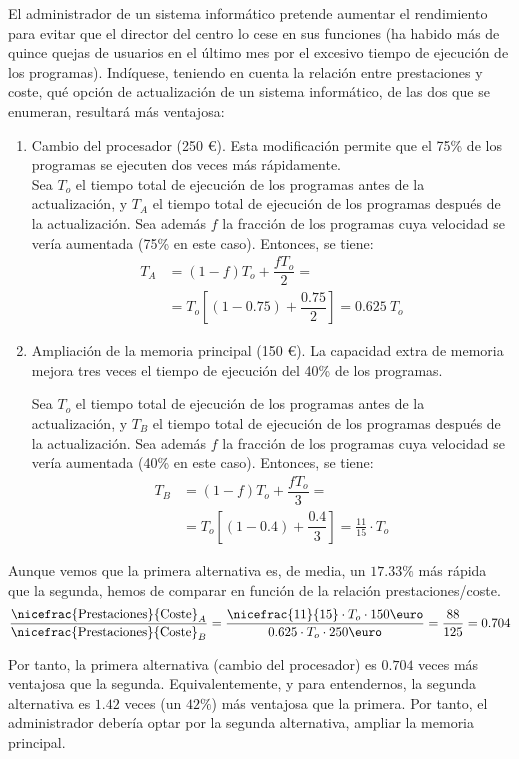 \begin{ejercicio}
El administrador de un sistema informático pretende aumentar el rendimiento para evitar que el director del centro lo cese en sus funciones (ha habido más de quince quejas de usuarios en el último mes por el excesivo tiempo de ejecución de los programas). Indíquese, teniendo en cuenta la relación entre prestaciones y coste, qué opción de actualización de un sistema informático, de las dos que se enumeran, resultará más ventajosa:
\begin{enumerate}
    \item Cambio del procesador (250 \euro). Esta modificación permite que el 75\% de los programas se ejecuten dos veces más rápidamente.\\
    
    Sea $T_o$ el tiempo total de ejecución de los programas antes de la actualización, y $T_A$ el tiempo total de ejecución de los programas después de la actualización. Sea además $f$ la fracción de los programas cuya velocidad se vería aumentada (75\% en este caso). Entonces, se tiene:
    \begin{align*}
        T_A &= (1-f)T_o + \dfrac{fT_o}{2}
        =\\&= T_o\left[(1-0.75) + \dfrac{0.75}{2}\right]
        = 0.625\ T_o
    \end{align*}
    \item Ampliación de la memoria principal (150 \euro). La capacidad extra de memoria mejora tres veces el tiempo de ejecución del 40\% de los programas.
    
    Sea $T_o$ el tiempo total de ejecución de los programas antes de la actualización, y $T_B$ el tiempo total de ejecución de los programas después de la actualización. Sea además $f$ la fracción de los programas cuya velocidad se vería aumentada (40\% en este caso). Entonces, se tiene:
    \begin{align*}
        T_B &= (1-f)T_o + \dfrac{fT_o}{3}
        =\\&= T_o\left[(1-0.4) + \dfrac{0.4}{3}\right]
        = \frac{11}{15}\cdot T_o
    \end{align*}
\end{enumerate}

Aunque vemos que la primera alternativa es, de media, un $17.33\%$ más rápida que la segunda, hemos de comparar en función de la relación prestaciones/coste.
\begin{equation*}
    \frac{\nicefrac{\text{Prestaciones}}{\text{Coste}}_A}{\nicefrac{\text{Prestaciones}}{\text{Coste}}_B} = \dfrac{\nicefrac{11}{15}\cdot T_o\cdot 150\text{\euro}}{0.625\cdot T_o\cdot 250\text{\euro}} = \dfrac{88}{125}=0.704
\end{equation*}

Por tanto, la primera alternativa (cambio del procesador) es $0.704$ veces más ventajosa que la segunda. Equivalentemente, y para entendernos, la segunda alternativa es $1.42$ veces (un $42\%$) más ventajosa que la primera. Por tanto, el administrador debería optar por la segunda alternativa, ampliar la memoria principal.
\end{ejercicio}
